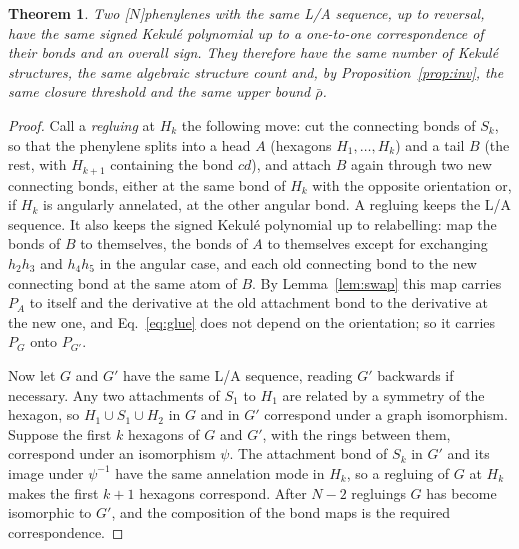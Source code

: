 \documentclass[11pt]{article}
\newtheorem{theorem}{Theorem}
\begin{document}
\begin{theorem}
\label{thm:la}
Two [$N$]phenylenes with the same L/A sequence, up to reversal, have the same signed Kekul\'e polynomial up to a one-to-one correspondence of their bonds and an overall sign. They therefore have the same number of Kekul\'e structures, the same algebraic structure count and, by Proposition~\ref{prop:inv}, the same closure threshold and the same upper bound $\bar\rho$.
\end{theorem}

\begin{proof}
Call a \emph{regluing} at $H_k$ the following move: cut the connecting bonds of $S_k$, so that the phenylene splits into a head $A$ (hexagons $H_1,\dots,H_k$) and a tail $B$ (the rest, with $H_{k+1}$ containing the bond $cd$), and attach $B$ again through two new connecting bonds, either at the same bond of $H_k$ with the opposite orientation or, if $H_k$ is angularly annelated, at the other angular bond. A regluing keeps the L/A sequence. It also keeps the signed Kekul\'e polynomial up to relabelling: map the bonds of $B$ to themselves, the bonds of $A$ to themselves except for exchanging $h_2h_3$ and $h_4h_5$ in the angular case, and each old connecting bond to the new connecting bond at the same atom of $B$. By Lemma~\ref{lem:swap} this map carries $P_A$ to itself and the derivative at the old attachment bond to the derivative at the new one, and Eq.~\eqref{eq:glue} does not depend on the orientation; so it carries $P_G$ onto $P_{G'}$.

Now let $G$ and $G'$ have the same L/A sequence, reading $G'$ backwards if necessary. Any two attachments of $S_1$ to $H_1$ are related by a symmetry of the hexagon, so $H_1\cup S_1\cup H_2$ in $G$ and in $G'$ correspond under a graph isomorphism. Suppose the first $k$ hexagons of $G$ and $G'$, with the rings between them, correspond under an isomorphism $\psi$. The attachment bond of $S_k$ in $G'$ and its image under $\psi^{-1}$ have the same annelation mode in $H_k$, so a regluing of $G$ at $H_k$ makes the first $k+1$ hexagons correspond. After $N-2$ regluings $G$ has become isomorphic to $G'$, and the composition of the bond maps is the required correspondence.
\end{proof}
\end{document}
